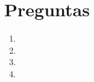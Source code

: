 \documentclass[11pt]{article}
\begin{document}



\pagebreak

\section*{Preguntas}

\begin{enumerate}
    \item  \medskip

    \item  \medskip

    \item  \medskip

    \item 
\end{enumerate}
\end{document}
